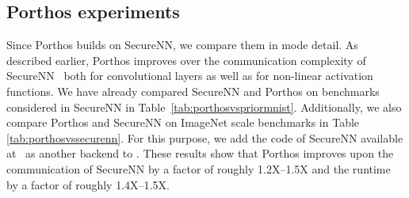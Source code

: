 
\subsection{Porthos experiments}\label{subsec:porthosexperiments}
Since Porthos builds on SecureNN, we compare them in mode detail.
As described earlier, Porthos improves over the communication complexity of SecureNN~\cite{securenn} both for convolutional layers as well as for non-linear activation functions.
We have already compared SecureNN and Porthos on benchmarks considered in SecureNN in Table~\ref{tab:porthosvspriormnist}.
Additionally, we also compare Porthos and SecureNN on ImageNet scale benchmarks in Table \ref{tab:porthosvssecurenn}. For this purpose, we add the code of SecureNN available at~\cite{securenncode} as another backend to \tool. These results show that Porthos improves upon the communication of SecureNN by a factor of roughly 1.2X--1.5X and the runtime by a factor of roughly 1.4X--1.5X.

\begin{table}
  \centering
 \caption{Porthos vs SecureNN.}
\label{tab:porthosvssecurenn}
\end{table}

